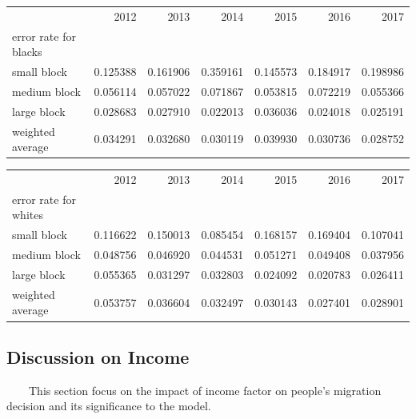 \documentclass{article}
\begin{document}
\begin{table}[!h]
\begin{tabular}{lrrrrrr}
\toprule
{} &      2012 &      2013 &      2014 &      2015 &      2016 &      2017 \\
error rate for blacks &           &           &           &           &           &           \\
\midrule
small block           &  0.125388 &  0.161906 &  0.359161 &  0.145573 &  0.184917 &  0.198986 \\
medium block          &  0.056114 &  0.057022 &  0.071867 &  0.053815 &  0.072219 &  0.055366 \\
large block           &  0.028683 &  0.027910 &  0.022013 &  0.036036 &  0.024018 &  0.025191 \\
weighted average      &  0.034291 &  0.032680 &  0.030119 &  0.039930 &  0.030736 &  0.028752 \\
\bottomrule
\end{tabular}

\begin{tabular}{lrrrrrr}
\toprule
{} &      2012 &      2013 &      2014 &      2015 &      2016 &      2017 \\
error rate for whites &           &           &           &           &           &           \\
\midrule
small block           &  0.116622 &  0.150013 &  0.085454 &  0.168157 &  0.169404 &  0.107041 \\
medium block          &  0.048756 &  0.046920 &  0.044531 &  0.051271 &  0.049408 &  0.037956 \\
large block           &  0.055365 &  0.031297 &  0.032803 &  0.024092 &  0.020783 &  0.026411 \\
weighted average      &  0.053757 &  0.036604 &  0.032497 &  0.030143 &  0.027401 &  0.028901 \\
\bottomrule
\end{tabular}
\end{table}

\subsection{Discussion on Income}
\ \ \ \ This section focus on the impact of income factor on people's migration decision and its significance to the model.
\end{document}
